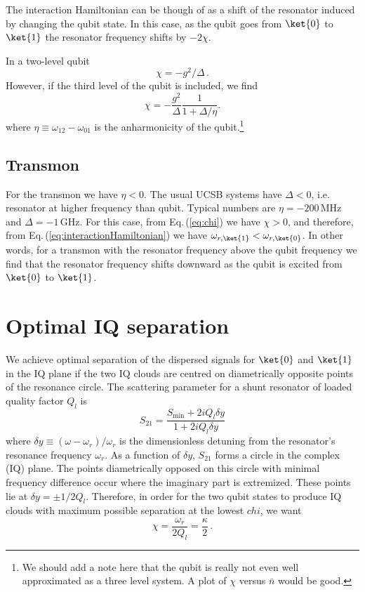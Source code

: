 \documentclass[twocolumn]{article}
\begin{document}
The interaction Hamiltonian can be though of as a shift of the resonator induced by changing the qubit state.
In this case, as the qubit goes from $\ket{0}$ to $\ket{1}$ the resonator frequency shifts by $-2 \chi$.

In a two-level qubit
\begin{equation}
\chi = -g^2/\Delta \, .
\end{equation}
However, if the third level of the qubit is included, we find
\begin{equation}
\chi = -\frac{g^2}{\Delta} \frac{1}{1 + \Delta / \eta} . \label{eq:chi}
\end{equation}
where $\eta \equiv \omega_{12} - \omega_{01}$ is the anharmonicity of the qubit.\footnote{We should add a note here that the qubit is really not even well approximated as a three level system. A plot of $\chi$ versus $\bar{n}$ would be good.}


\subsection{Transmon}
For the transmon we have $\eta < 0$.
The usual UCSB systems have $\Delta < 0$, i.e. resonator at higher frequency than qubit.
Typical numbers are $\eta = -200\,\text{MHz}$ and $\Delta = -1\,\text{GHz}$.
For this case, from Eq.\,(\ref{eq:chi}) we have $\chi > 0$, and therefore, from Eq.\,(\ref{eq:interactionHamiltonian}) we have $\omega_{r,\ket{1}} < \omega_{r,\ket{0}}$.
In other words, for a transmon with the resonator frequency above the qubit frequency we find that the resonator frequency shifts downward as the qubit is excited from $\ket{0}$ to $\ket{1}$.


\section{Optimal IQ separation}

We achieve optimal separation of the dispersed signals for $\ket{0}$ and $\ket{1}$ in the IQ plane if the two IQ clouds are centred on diametrically opposite points of the resonance circle.
The scattering parameter for a shunt resonator of loaded quality factor $Q_l$ is
\begin{equation}
S_{21} = \frac{S_\text{min} + 2 i Q_l \delta y}{1 + 2 i Q_l \delta y}
\end{equation}
where $\delta y \equiv (\omega - \omega_r) / \omega_r$ is the dimensionless detuning from the resonator's resonance frequency $\omega_r$.
As a function of $\delta y$, $S_{21}$ forms a circle in the complex (IQ) plane.
The points diametrically opposed on this circle with minimal frequency difference occur where the imaginary part is extremized.
These points lie at $\delta y = \pm 1 / 2 Q_l$.
Therefore, in order for the two qubit states to produce IQ clouds with maximum possible separation at the lowest $chi$, we want
\begin{equation}
\chi = \frac{\omega_r}{2 Q_l} = \frac{\kappa}{2} \, .
\end{equation}
\end{document}
